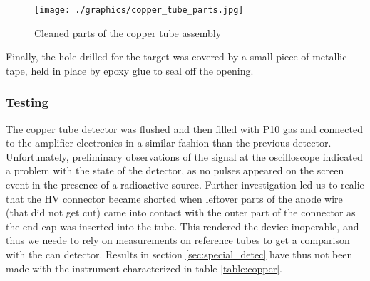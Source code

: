 \begin{figure}[h]
  \centering
  \texttt{[image: ./graphics/copper\_tube\_parts.jpg]}
  \caption{Cleaned parts of the copper tube assembly}
  \label{fig:copper_parts}
\end{figure}

Finally, the hole drilled for the target was covered by a small piece of metallic tape, held in place by epoxy glue to seal off the opening.

\subsubsection{Testing}

The copper tube detector was flushed and then filled with P10 gas and connected to the amplifier electronics in a similar fashion than the previous detector. Unfortunately, preliminary observations of the signal at the oscilloscope indicated a problem with the state of the detector, as no pulses appeared on the screen event in the presence of a radioactive source. Further investigation led us to realie that the HV connector became shorted when leftover parts of the anode wire (that did not get cut) came into contact with the outer part of the connector as the end cap was inserted into the tube. This rendered the device inoperable, and thus we neede to rely on measurements on reference tubes to get a comparison with the can detector. Results in section \ref{sec:special_detec} have thus not been made with the instrument characterized in table \ref{table:copper}.
